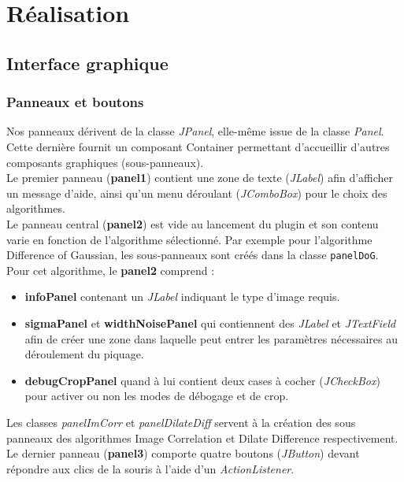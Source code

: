 \chapter{Réalisation}

\section{Interface graphique}

\subsection{Panneaux et boutons}

Nos panneaux dérivent de la classe \emph{JPanel}, elle-même issue de la classe \emph{Panel}. Cette dernière fournit un composant Container permettant d'accueillir d'autres composants graphiques (sous-panneaux).\\

Le premier panneau (\textbf{panel1}) contient une zone de texte (\emph{JLabel}) afin d'afficher un message d'aide, ainsi qu'un menu déroulant (\emph{JComboBox}) pour le choix des algorithmes. \\

Le panneau central (\textbf{panel2}) est vide au lancement du plugin et son contenu varie en fonction de l'algorithme sélectionné. Par exemple pour l'algorithme Difference of Gaussian, les sous-panneaux sont créés dans la classe \texttt{panelDoG}. Pour cet algorithme, le \textbf{panel2} comprend :
\begin{itemize}
\item \textbf{infoPanel} contenant un \emph{JLabel} indiquant le type d'image requis.
\item \textbf{sigmaPanel} et \textbf{widthNoisePanel} qui contiennent des \emph{JLabel} et \emph{JTextField} afin de créer une zone dans laquelle peut entrer les paramètres nécessaires au déroulement du piquage. 
\item \textbf{debugCropPanel} quand à lui contient deux cases à cocher (\emph{JCheckBox}) pour activer ou non les modes de débogage et de crop. 
\end{itemize}
Les classes \emph{panelImCorr} et \emph{panelDilateDiff} servent à la création des sous panneaux des algorithmes Image Correlation et Dilate Difference respectivement. \\

Le dernier panneau (\textbf{panel3}) comporte quatre boutons (\emph{JButton}) devant répondre aux clics de la souris à l'aide d'un \emph{ActionListener}. \\

